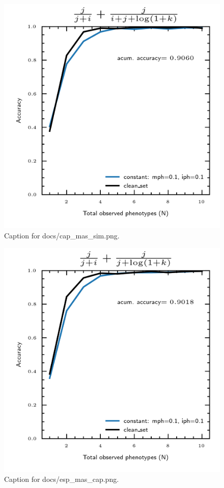 \documentclass{article}
\begin{document}
\begin{figure}[h] \centering \includegraphics{docs/cap_mas_sim.png} \caption{Caption for docs/cap_mas_sim.png.} \end{figure}
\begin{figure}[h] \centering \includegraphics{docs/esp_mas_cap.png} \caption{Caption for docs/esp_mas_cap.png.} \end{figure}
\end{document}
